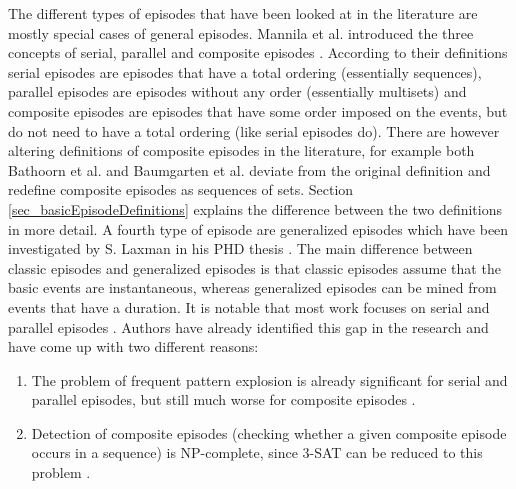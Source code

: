 The different types of episodes that have been looked at in the literature are mostly special cases of general episodes. Mannila et al. introduced the three concepts of serial, parallel and composite episodes \cite{mannila1995discovering}. According to their definitions serial episodes are episodes that have a total ordering (essentially sequences), parallel episodes are episodes without any order (essentially multisets) and composite episodes are episodes that have some order imposed on the events, but do not need to have a total ordering (like serial episodes do). There are however altering definitions of composite episodes in the literature, for example both Bathoorn et al. \cite{bathoorn2007finding} and Baumgarten et al. \cite{baumgarten2003tree} deviate from the original definition and redefine composite episodes as sequences of sets. Section \ref{sec_basicEpisodeDefinitions} explains the difference between the two definitions in more detail. A fourth type of episode are generalized episodes which have been investigated by S. Laxman in his PHD thesis \cite{laxman2006discovering}. The main difference between classic episodes and generalized episodes is that classic episodes assume that the basic events are instantaneous, whereas generalized episodes can be mined from events that have a duration. It is notable that most work focuses on serial and parallel episodes \cite{mannila1995discovering} \cite{mannila1997discovery} \cite{laxman2006discovering} \cite{laxman2007fast}. Authors have already identified this gap in the research and have come up with two different reasons:
\begin{enumerate}
	\item The problem of frequent pattern explosion is already significant for serial and parallel episodes, but still much worse for composite episodes \cite{bathoorn2007finding}.
	\item Detection of composite episodes (checking whether a given composite episode occurs in a sequence) is NP-complete, since 3-SAT can be reduced to this problem \cite{tatti2011mining}.
\end{enumerate}

